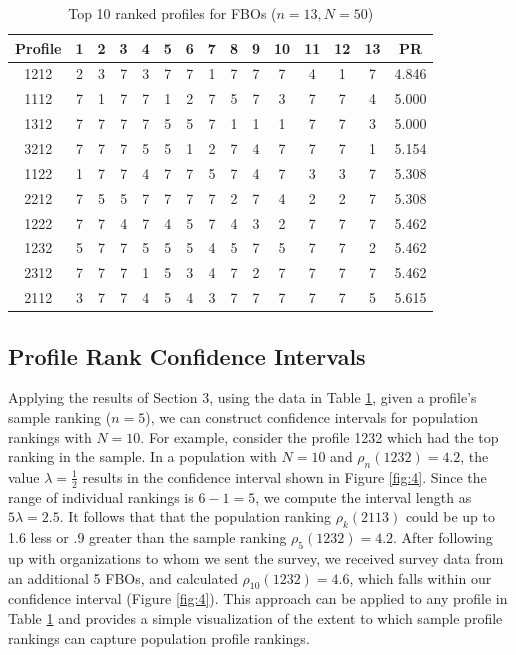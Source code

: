 \documentclass[a4paper, 12pt]{article}
\begin{document}
\begin{table}[!htpb]
\scriptsize
\centering
\begin{tabular}{c|ccccc|ccccc|ccc|c}
Profile& 1 & 2 & 3 & 4 & 5 & 6&7&8&9&10&11&12&13&PR\\\hline
1212& 2&	3&	7&	3&	7&	7&	1&	7&	7&	7&	4&	1&	7&	4.846\\
1112&7	&1	&7	&7	&1	&2	&7	&5	&7	&3	&7	&7	&4	&5.000\\
1312&7	&7	&7	&7	&5	&5	&7	&1	&1	&1	&7	&7	&3	&5.000\\
3212&7	&7	&7	&5	&5	&1	&2	&7	&4	&7	&7	&7	&1	&5.154\\
1122&1	&7	&7	&4	&7	&7	&5	&7	&4	&7	&3	&3	&7	&5.308\\
2212&7	&5	&5	&7	&7	&7	&7	&2	&7	&4	&2	&2	&7	&5.308\\
1222&7	&7	&4	&7	&4	&5	&7	&4	&3	&2	&7	&7	&7	&5.462\\
1232&5	&7	&7	&5	&5	&5	&4	&5	&7	&5	&7	&7	&2	&5.462\\
2312&7	&7	&7	&1	&5	&3	&4	&7	&2	&7	&7	&7	&7	&5.462\\
2112&3	&7	&7	&4	&5	&4	&3	&7	&7	&7	&7	&7	&5	&5.615\\\hline
\end{tabular}
\caption{{\small Top 10 ranked profiles for FBOs ($n=13,N=50$) }   }
\label{Tab13}
\end{table}


\subsection{Profile Rank Confidence Intervals}

Applying the results of Section 3, using the data in Table \ref{Tab13}, given a profile's sample ranking ($n=5$), we can construct confidence intervals for  population rankings with $N=10$. For example, consider the  profile 1232 which had the top ranking in the sample.  In a population with $N=10$ and $\rho_n(1232)=4.2$, the value $\lambda=\frac{1}{2}$ results in the confidence interval shown in Figure \ref{fig:4}. Since the range of individual rankings is $6-1=5$, we compute the interval length as $5\lambda = 2.5$. It follows that that the population ranking $\rho_k(2113)$ could be up to 1.6 less or .9 greater than the sample ranking $\rho_5(1232)=4.2$. After following up with organizations to whom we sent the survey, we received survey data from an additional 5 FBOs, and calculated $\rho_{10}(1232)=4.6$, which falls within our confidence interval (Figure \ref{fig:4}). This approach can be applied to any profile in Table \ref{Tab13} and provides a simple visualization  of the extent to which sample profile rankings can capture population profile rankings.
\end{document}

